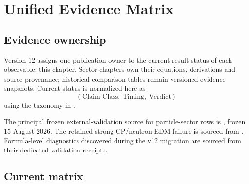 \chapter{Unified Evidence Matrix}
\label{ch:v12_evidence_matrix}

\section{Evidence ownership}

Version 12 assigns one publication owner to the current result status of each observable: this chapter. Sector chapters own their equations, derivations and source provenance; historical comparison tables remain versioned evidence snapshots. Current status is normalized here as
\[
\boxed{(\text{Claim Class},\ \text{Timing},\ \text{Verdict})}
\]
using the taxonomy in .

The principal frozen external-validation source for particle-sector rows is
, frozen 15 August 2026. The retained strong-CP/neutron-EDM failure is sourced from . Formula-level diagnostics discovered during the v12 migration are sourced from their dedicated validation receipts.

\section{Current matrix}

